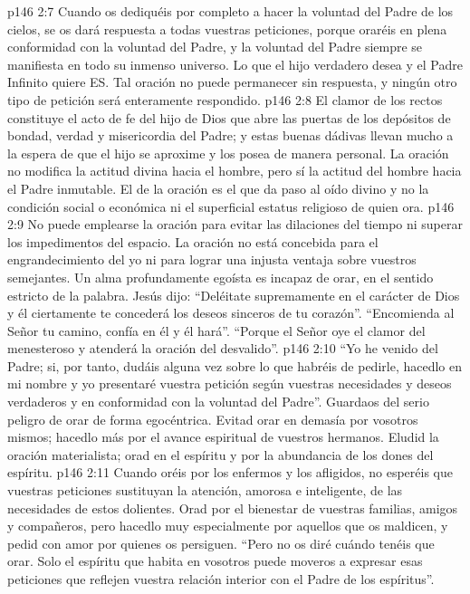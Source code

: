 \vs p146 2:7 Cuando os dediquéis por completo a hacer la voluntad del Padre de los cielos, se os dará respuesta a todas vuestras peticiones, porque oraréis en plena conformidad con la voluntad del Padre, y la voluntad del Padre siempre se manifiesta en todo su inmenso universo. Lo que el hijo verdadero desea y el Padre Infinito quiere ES. Tal oración no puede permanecer sin respuesta, y ningún otro tipo de petición será enteramente respondido.
\vs p146 2:8 El clamor de los rectos constituye el acto de fe del hijo de Dios que abre las puertas de los depósitos de bondad, verdad y misericordia del Padre; y estas buenas dádivas llevan mucho a la espera de que el hijo se aproxime y los posea de manera personal. La oración no modifica la actitud divina hacia el hombre, pero sí la actitud del hombre hacia el Padre inmutable. El  de la oración es el que da paso al oído divino y no la condición social o económica ni el superficial estatus religioso de quien ora.
\vs p146 2:9 No puede emplearse la oración para evitar las dilaciones del tiempo ni superar los impedimentos del espacio. La oración no está concebida para el engrandecimiento del yo ni para lograr una injusta ventaja sobre vuestros semejantes. Un alma profundamente egoísta es incapaz de orar, en el sentido estricto de la palabra. Jesús dijo: “Deléitate supremamente en el carácter de Dios y él ciertamente te concederá los deseos sinceros de tu corazón”. “Encomienda al Señor tu camino, confía en él y él hará”. “Porque el Señor oye el clamor del menesteroso y atenderá la oración del desvalido”.
\vs p146 2:10 “Yo he venido del Padre; si, por tanto, dudáis alguna vez sobre lo que habréis de pedirle, hacedlo en mi nombre y yo presentaré vuestra petición según vuestras necesidades y deseos verdaderos y en conformidad con la voluntad del Padre”. Guardaos del serio peligro de orar de forma egocéntrica. Evitad orar en demasía por vosotros mismos; hacedlo más por el avance espiritual de vuestros hermanos. Eludid la oración materialista; orad en el espíritu y por la abundancia de los dones del espíritu.
\vs p146 2:11 Cuando oréis por los enfermos y los afligidos, no esperéis que vuestras peticiones sustituyan la atención, amorosa e inteligente, de las necesidades de estos dolientes. Orad por el bienestar de vuestras familias, amigos y compañeros, pero hacedlo muy especialmente por aquellos que os maldicen, y pedid con amor por quienes os persiguen. “Pero no os diré cuándo tenéis que orar. Solo el espíritu que habita en vosotros puede moveros a expresar esas peticiones que reflejen vuestra relación interior con el Padre de los espíritus”.

